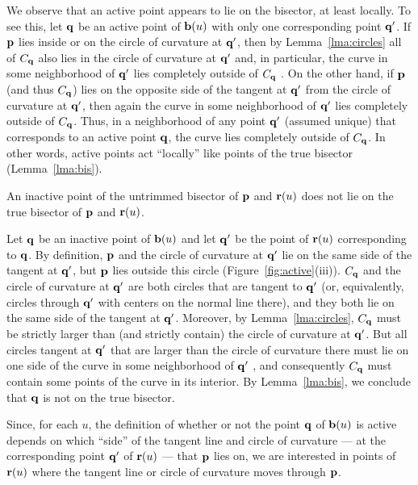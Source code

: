 \begin{rmk}
\label{r:active}
{\rm
We observe that an active point appears to lie on the bisector, at least
locally. To see this, let ${\bf q}$ be an active point of ${\bf b}(u)$
with only one corresponding point ${\bf q}'$. If ${\bf p}$ lies inside or
on the circle of curvature at ${\bf q}'$, then by Lemma~\ref{lma:circles}
all of $C_{\bf q}$ also lies in the circle of curvature at ${\bf q}'$ and,
in particular, the curve in some neighborhood of ${\bf q}'$
lies completely outside of $C_{\bf q}$ \cite[p.~176]{H52}.
On the other hand, if ${\bf p}$ (and thus $C_{\bf q}$) lies on the opposite side
of the tangent at ${\bf q}'$ from the circle of curvature at ${\bf q}'$,
then again the curve in some neighborhood of ${\bf q}'$ lies completely outside of
$C_{\bf q}$.
Thus, in a neighborhood of any point ${\bf q}'$ (assumed unique)
that corresponds to an
active point ${\bf q}$, the curve
lies completely outside of $C_{\bf q}$.
In other words, active points act ``locally''
like points of the true bisector (Lemma~\ref{lma:bis}).
}
\end{rmk}

\begin{propn}
An inactive point of the untrimmed bisector of ${\bf p}$ and ${\bf r}(u)$
does not lie on the true bisector of ${\bf p}$ and ${\bf r}(u)$.
\end{propn}
\prf
Let ${\bf q}$ be an inactive point of ${\bf b}(u)$ and let ${\bf q}'$
be the point of ${\bf r}(u)$ corresponding to ${\bf q}$. By definition,
${\bf p}$ and the circle of curvature at ${\bf q}'$ lie on the same side
of the tangent at ${\bf q}'$, but ${\bf p}$ lies outside this circle
(Figure~\ref{fig:active}(iii)). $C_{\bf q}$ and the circle of curvature
at ${\bf q}'$ are both circles that are tangent to ${\bf q}'$ (or,
equivalently, circles through ${\bf q}'$ with centers on the normal
line there), and they both lie on the same side of the tangent at
${\bf q}'$. Moreover, by Lemma~\ref{lma:circles}, $C_{\bf q}$ must
be strictly larger than (and strictly contain) the circle of curvature
at ${\bf q}'$. But all circles tangent at ${\bf q}'$ that are larger
than the circle of curvature there must lie on one side of the curve
in some neighborhood of ${\bf q}'$ \cite[p.~176]{H52}, and consequently
$C_{\bf q}$ must contain some points of the curve in its interior. By
Lemma~\ref{lma:bis}, we conclude that ${\bf q}$ is not on the true
bisector.
\QED

Since, for each $u$, the definition of whether or not the point
${\bf q}$ of ${\bf b}(u)$ is active depends on which ``side'' of the
tangent line and circle of curvature --- at the corresponding point
${\bf q}'$ of ${\bf r}(u)$ --- that ${\bf p}$ lies on, we are interested
in points of ${\bf r}(u)$ where the tangent line or circle of curvature
moves through ${\bf p}$.

